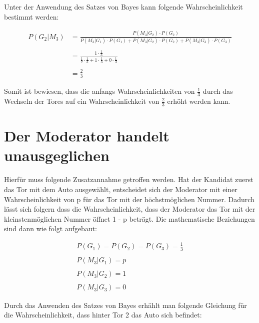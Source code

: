 Unter der Anwendung des Satzes von Bayes kann folgende Wahrscheinlichkeit bestimmt werden:

\begin{equation}
    \begin{split}
        P(G_2 | M_3) & = \frac{P(M_3 | G_2) \cdot P(G_2)}{P(M_3 | G_1) \cdot P(G_1) +
        P(M_3 | G_2) \cdot P(G_2) + P(M_3 | G_3) \cdot P(G_3)} 
        \\
        \\
        & = \frac{1 \cdot \frac{1}{3}}{\frac{1}{2} \cdot \frac{1}{3} + 1 \cdot \frac{1}{3} + 0 \cdot \frac{1}{3}} 
        \\
        \\
        & = \frac{2}{3}
    \end{split}
\end{equation}

Somit ist bewiesen, dass die anfangs Wahrscheinlichkeiten von $\frac{1}{3}$ durch das Wechseln der Tores auf ein Wahrscheinlichkeit von $\frac{2}{3}$ erhöht werden kann.  
\newpage
\section{Der Moderator handelt unausgeglichen}
Hierfür muss folgende Zusatzannahme getroffen werden. Hat der Kandidat zuerst das Tor mit dem Auto ausgewählt, entscheidet sich der Moderator mit einer Wahrscheinlichkeit von p 
für das Tor mit der höchstmöglichen Nummer. Dadurch lässt sich folgern dass die Wahrscheinlichkeit, dass der Moderator das Tor mit der kleinstenmöglichen Nummer öffnet 1 - p beträgt.
Die mathematische Beziehungen sind dann wie folgt aufgebaut:

\begin{equation} \label{eq1}
    \begin{split}
        P(G_1) = P(G_2) = P(G_3) = \frac{1}{3} 
        \\
        \\
        P(M_3 | G_1) = p 
        \\
        \\
        P(M_3 | G_2) = 1 
        \\
        \\ 
        P(M_3 | G_3) = 0
    \end{split}
\end{equation}

Durch das Anwenden des Satzes von Bayes erhählt man folgende Gleichung für die Wahrscheinlichkeit, dass hinter Tor 2 das Auto sich befindet:

